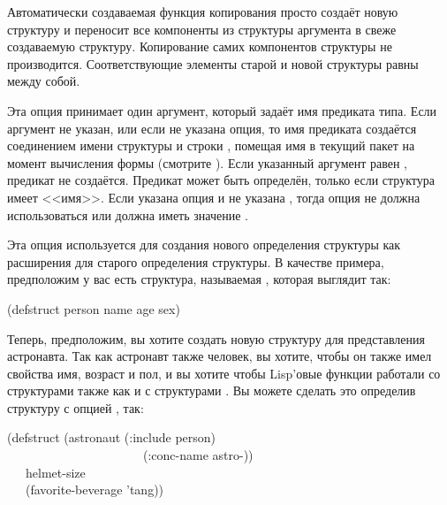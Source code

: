 \begin{flushdesc}
Автоматически создаваемая функция копирования просто создаёт новую структуру и
переносит все компоненты из структуры аргумента в свеже создаваемую
структуру. Копирование самих компонентов структуры не производится.
Соответствующие элементы старой и новой структуры равны  между собой.

\item[\cd{:predicate}]
Эта опция принимает один аргумент, который задаёт имя предиката типа.
Если аргумент не указан, или если не указана опция, то имя предиката создаётся
соединением имени структуры и строки , помещая имя в текущий пакет на
момент вычисления формы  (смотрите ).
Если указанный аргумент равен {\false}, предикат не создаётся.
Предикат может быть определён, только если структура имеет <<имя>>.
Если указана опция  и не указана , тогда опция
 не должна использоваться или должна иметь значение {\false}.

\item[\cd{:include}]
Эта опция используется для создания нового определения структуры как расширения
для старого определения структуры. В качестве примера, предположим у вас есть
структура, называемая , которая выглядит так:
\begin{lisp}
(defstruct person name age sex)
\end{lisp}
Теперь, предположим, вы хотите создать новую структуру для представления
астронавта.
Так как астронавт также человек, вы хотите, чтобы он также имел свойства имя,
возраст и пол, и вы хотите чтобы Lisp'овые функции работали со структурами 
также как и с структурами . Вы можете сделать это определив
структуру  с опцией , так:
\begin{lisp}
(defstruct (astronaut (:include person) \\
~~~~~~~~~~~~~~~~~~~~~~(:conc-name astro-)) \\
~~~helmet-size \\
~~~(favorite-beverage 'tang))
\end{lisp}


\end{flushdesc}
